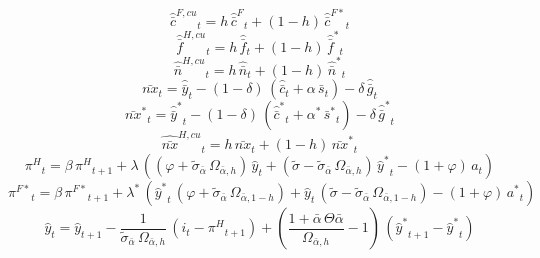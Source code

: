 \begin{dmath}
{{\hat {\bar c}^{F,cu}}}_{t}={{h}}\, {{\hat {\bar c}^F}}_{t}+\left(1-{{h}}\right)\, {{\hat {\bar c}^{F*}}}_{t}
\end{dmath}
\begin{dmath}
{{\hat {\bar f}^{H,cu}}}_{t}={{h}}\, {{\hat {\bar f}}}_{t}+\left(1-{{h}}\right)\, {{\hat {\bar f}^*}}_{t}
\end{dmath}
\begin{dmath}
{{\hat {\bar n}^{H,cu}}}_{t}={{h}}\, {{\hat {\bar n}}}_{t}+\left(1-{{h}}\right)\, {{\hat {\bar n}^*}}_{t}
\end{dmath}
\begin{dmath}
{{\bar{nx}}}_{t}={{\hat {\bar y}}}_{t}-\left(1-{{\delta}}\right)\, \left({{\hat {\bar c}}}_{t}+{{\alpha}}\, {{\bar s}}_{t}\right)-{{\delta}}\, {{\hat {\bar g}}}_{t}
\end{dmath}
\begin{dmath}
{{\bar{nx}^*}}_{t}={{\hat {\bar y}^*}}_{t}-\left(1-{{\delta}}\right)\, \left({{\hat {\bar c}^*}}_{t}+{{\alpha^*}}\, {{\bar s^*}}_{t}\right)-{{\delta}}\, {{\hat {\bar g}^*}}_{t}
\end{dmath}
\begin{dmath}
{{\hat {\bar{nx}}^{H,cu}}}_{t}={{h}}\, {{\bar{nx}}}_{t}+\left(1-{{h}}\right)\, {{\bar{nx}^*}}_{t}
\end{dmath}
\begin{dmath}
{{\pi^H}}_{t}={{\beta}}\, {{\pi^H}}_{t+1}+{{\lambda}}\, \left(\left({{\varphi}}+{{\tilde\sigma_{\bar{\alpha}}}}\, {{\Omega_{\bar \alpha,h}}}\right)\, {{\hat y}}_{t}+\left({{\tilde{\sigma}}}-{{\tilde\sigma_{\bar{\alpha}}}}\, {{\Omega_{\bar \alpha,h}}}\right)\, {{\hat y^*}}_{t}-\left(1+{{\varphi}}\right)\, {{a}}_{t}\right)
\end{dmath}
\begin{dmath}
{{\pi^{F*}}}_{t}={{\beta}}\, {{\pi^{F*}}}_{t+1}+{{\lambda^*}}\, \left({{\hat y^*}}_{t}\, \left({{\varphi}}+{{\tilde\sigma_{\bar{\alpha}}}}\, {{\Omega_{\bar \alpha,1-h}}}\right)+{{\hat y}}_{t}\, \left({{\tilde{\sigma}}}-{{\tilde\sigma_{\bar{\alpha}}}}\, {{\Omega_{\bar \alpha,1-h}}}\right)-\left(1+{{\varphi}}\right)\, {{a^*}}_{t}\right)
\end{dmath}
\begin{dmath}
{{\hat y}}_{t}={{\hat y}}_{t+1}-\frac{1}{{{\tilde\sigma_{\bar{\alpha}}}}\, {{\Omega_{\bar \alpha,h}}}}\, \left({{i}}_{t}-{{\pi^H}}_{t+1}\right)+\left(\frac{1+{{\bar{\alpha}}}\, {{\Theta{\bar{\alpha}}}}}{{{\Omega_{\bar \alpha,h}}}}-1\right)\, \left({{\hat y^*}}_{t+1}-{{\hat y^*}}_{t}\right)
\end{dmath}
